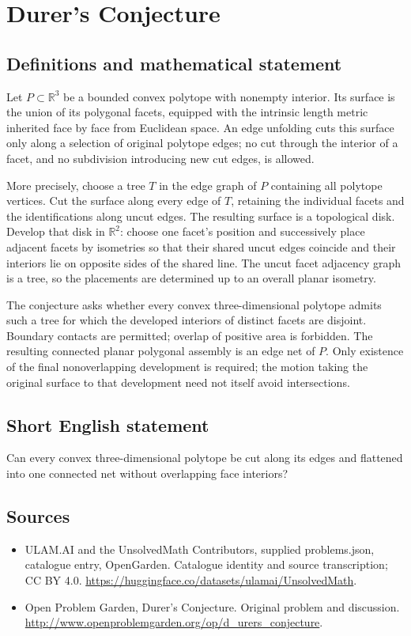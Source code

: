 \documentclass[11pt,a4paper]{article}
\begin{document}
\section*{Durer's Conjecture}\label{statement}

\subsection{Definitions and mathematical statement}
Let $P\subset\mathbb R^3$ be a bounded convex polytope with nonempty interior. Its surface is the union of its polygonal facets, equipped with the intrinsic length metric inherited face by face from Euclidean space. An edge unfolding cuts this surface only along a selection of original polytope edges; no cut through the interior of a facet, and no subdivision introducing new cut edges, is allowed.

More precisely, choose a tree $T$ in the edge graph of $P$ containing all polytope vertices. Cut the surface along every edge of $T$, retaining the individual facets and the identifications along uncut edges. The resulting surface is a topological disk. Develop that disk in $\mathbb R^2$: choose one facet's position and successively place adjacent facets by isometries so that their shared uncut edges coincide and their interiors lie on opposite sides of the shared line. The uncut facet adjacency graph is a tree, so the placements are determined up to an overall planar isometry.

The conjecture asks whether every convex three-dimensional polytope admits such a tree for which the developed interiors of distinct facets are disjoint. Boundary contacts are permitted; overlap of positive area is forbidden. The resulting connected planar polygonal assembly is an edge net of $P$. Only existence of the final nonoverlapping development is required; the motion taking the original surface to that development need not itself avoid intersections.
\subsection{Short English statement}
Can every convex three-dimensional polytope be cut along its edges and flattened into one connected net without overlapping face interiors?
\subsection{Sources}
\begin{itemize}
\item[S1] ULAM.AI and the UnsolvedMath Contributors, supplied problems.json, catalogue entry, OpenGarden. Catalogue identity and source transcription; CC BY 4.0.
\url{https://huggingface.co/datasets/ulamai/UnsolvedMath}.
\item[S2] Open Problem Garden, Durer's Conjecture. Original problem and discussion.
\url{http://www.openproblemgarden.org/op/d_urers_conjecture}.
\end{itemize}
\end{document}
